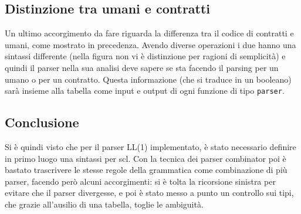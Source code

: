 \documentclass[]{article}
\begin{document}
\hypertarget{distinzione-tra-umani-e-contratti}{%
\subsection{Distinzione tra umani e
contratti}\label{distinzione-tra-umani-e-contratti}}

Un ultimo accorgimento da fare riguarda la differenza tra il codice di
contratti e umani, come mostrato in precedenza. Avendo diverse
operazioni i due hanno una sintassi differente (nella figura non vi è
distinzione per ragioni di semplicità) e quindi il parser nella sua
analisi deve sapere se sta facendo il parsing per un umano o per un
contratto. Questa informazione (che si traduce in un booleano) sarà
insieme alla tabella come input e output di ogni funzione di tipo
\texttt{parser}.

\hypertarget{conclusione}{%
\subsection{Conclusione}\label{conclusione}}

Si è quindi visto che per il parser LL(1) implementato, è stato
necessario definire in primo luogo una sintassi per scl. Con la tecnica
dei parser combinator poi è bastato trascrivere le stesse regole della
grammatica come combinazione di più parser, facendo però alcuni
accorgimenti: si è tolta la ricorsione sinistra per evitare che il
parser divergesse, e poi è stato messo a punto un controllo sui tipi,
che grazie all'ausilio di una tabella, toglie le ambiguità.
\end{document}
